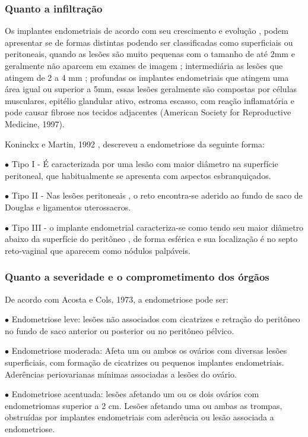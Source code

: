 \documentclass[12pt]{article} %
\begin{document}
\subsubsection{Quanto a infiltração}



Os implantes endometriais de acordo com seu crescimento e evolução , podem apresentar se de formas distintas podendo ser classificadas como superficiais ou peritoneais, quando as lesões são muito pequenas com o tamanho de até 2mm e geralmente não aparcem em exames de imagem ; intermediária as lesões que atingem de 2 a 4 mm ; profundas os implantes endometriais que atingem uma área igual ou superior a 5mm, essas lesões geralmente são compostas por células musculares, epitélio glandular ativo, estroma escasso, com reação inflamatória e pode causar fibrose nos tecidos adjacentes (American Society for Reproductive Medicine, 1997).

Koninckx e Martin, 1992 , descreveu a endometriose da seguinte forma:

$\bullet$ Tipo I - É caracterizada por uma lesão com maior diâmetro na superfície peritoneal, que habitualmente se apresenta com aspectos esbranquiçados.

$\bullet$ Tipo II - Nas lesões peritoneais , o reto encontra-se aderido ao fundo de saco de Douglas e ligamentos uterossacros.

$\bullet$ Tipo III - o implante endometrial caracteriza-se como tendo seu maior diâmetro abaixo da superfície do peritôneo , de forma esférica e sua localização é no septo reto-vaginal que aparecem como nódulos palpáveis. 

\subsubsection{Quanto a severidade e o comprometimento dos órgãos}

De acordo com Acosta e Cols, 1973, a endometriose pode ser:


$\bullet$ Endometriose leve: lesões não associados com cicatrizes e retração do peritôneo no fundo de saco anterior ou posterior ou no peritôneo pélvico.


$\bullet$ Endometriose moderada: Afeta um ou ambos os ovários com diversas lesões superficiais, com formação de cicatrizes ou pequenos implantes endometriais. Aderências periovarianas mínimas associadas a lesões do ovário.


$\bullet$ Endometriose acentuada: lesões afetando um ou os dois ovários com endometriomas superior a 2 cm. Lesões afetando uma ou ambas as trompas, obstruídas por implantes endometriais com aderência ou lesão associada a endometriose.
\end{document}
